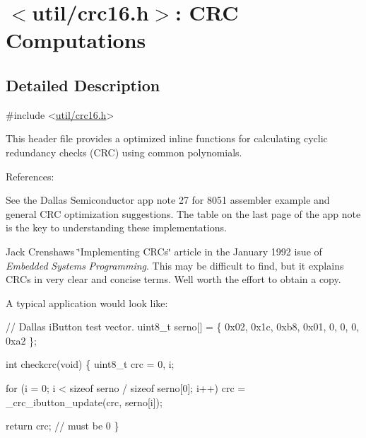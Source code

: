 \hypertarget{group__util__crc}{}\section{$<$util/crc16.h$>$\+: C\+RC Computations}
\label{group__util__crc}


\subsection{Detailed Description}

\begin{DoxyCode}
\textcolor{preprocessor}{#include <\hyperlink{util_2crc16_8h}{util/crc16.h}>}
\end{DoxyCode}


This header file provides a optimized inline functions for calculating cyclic redundancy checks (C\+RC) using common polynomials.

\begin{DoxyParagraph}{References\+:}

\end{DoxyParagraph}
\begin{DoxyParagraph}{}

\end{DoxyParagraph}
See the Dallas Semiconductor app note 27 for 8051 assembler example and general C\+RC optimization suggestions. The table on the last page of the app note is the key to understanding these implementations.

\begin{DoxyParagraph}{}

\end{DoxyParagraph}
Jack Crenshaw\textquotesingle{}s \char`\"{}\+Implementing C\+R\+Cs\char`\"{} article in the January 1992 isue of {\itshape Embedded} {\itshape Systems} {\itshape Programming}. This may be difficult to find, but it explains C\+RC\textquotesingle{}s in very clear and concise terms. Well worth the effort to obtain a copy.

A typical application would look like\+:


\begin{DoxyCode}
\textcolor{comment}{// Dallas iButton test vector.}
uint8\_t serno[] = \{ 0x02, 0x1c, 0xb8, 0x01, 0, 0, 0, 0xa2 \};

\textcolor{keywordtype}{int}
checkcrc(\textcolor{keywordtype}{void})
\{
uint8\_t crc = 0, i;

\textcolor{keywordflow}{for} (i = 0; i < \textcolor{keyword}{sizeof} serno / \textcolor{keyword}{sizeof} serno[0]; i++)
    crc = \_crc\_ibutton\_update(crc, serno[i]);

\textcolor{keywordflow}{return} crc; \textcolor{comment}{// must be 0}
\}
\end{DoxyCode}
 